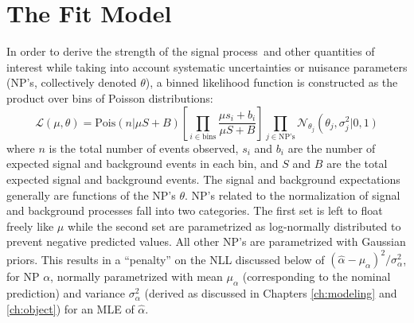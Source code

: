 \section{The Fit Model}
In order to derive the strength of the signal process \ZH\,and other quantities of interest while taking into account systematic uncertainties or nuisance parameters (NP's, collectively denoted $\theta$), a binned likelihood function is constructed as the product over bins of Poisson distributions:
\begin{equation}
\label{eqn:like}
\mathcal{L}\left(\mu,\theta\right)=\text{Pois}\left(n\right.\left|\mu S+B\right)\left[\prod_{i\in\text{bins}}\frac{\mu s_i+b_i}{\mu S+B}\right]\prod_{j\in\text{NP's}}\mathcal{N}_{\theta_j}\left(\theta_j,\sigma_j^2\right.\left|0,1\right)
\end{equation}
where $n$ is the total number of events observed, $s_i$ and $b_i$ are the number of expected signal and background events in each bin, and $S$ and $B$ are the total expected signal and background events.  The signal and background expectations generally are functions of the  NP's $\theta$.  NP's related to the normalization of signal and background processes fall into two categories.  The first set is left to float freely like $\mu$ while the second set are parametrized as log-normally distributed to prevent negative predicted values.  All other NP's are parametrized with Gaussian priors.  This results in a ``penalty'' on the NLL discussed below of $\left(\hat{\alpha}-\mu_{\alpha}\right)^2/\sigma_{\alpha}^2$, for NP $\alpha$, normally parametrized with mean $\mu_{\alpha}$ (corresponding to the nominal prediction) and variance $\sigma_{\alpha}^2$ (derived as discussed in Chapters \ref{ch:modeling} and \ref{ch:object}) for an MLE of $\hat{\alpha}$.  

